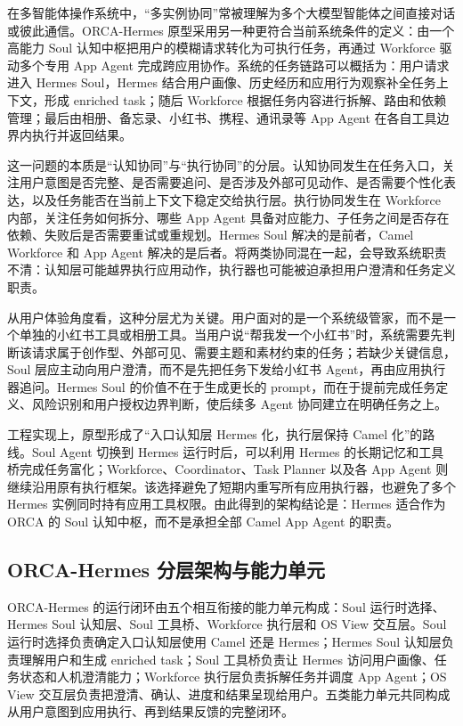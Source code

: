 在多智能体操作系统中，“多实例协同”常被理解为多个大模型智能体之间直接对话或彼此通信。ORCA-Hermes 原型采用另一种更符合当前系统条件的定义：由一个高能力 Soul 认知中枢把用户的模糊请求转化为可执行任务，再通过 Workforce 驱动多个专用 App Agent 完成跨应用协作。系统的任务链路可以概括为：用户请求进入 Hermes Soul，Hermes 结合用户画像、历史经历和应用行为观察补全任务上下文，形成 enriched task；随后 Workforce 根据任务内容进行拆解、路由和依赖管理；最后由相册、备忘录、小红书、携程、通讯录等 App Agent 在各自工具边界内执行并返回结果。

这一问题的本质是“认知协同”与“执行协同”的分层。认知协同发生在任务入口，关注用户意图是否完整、是否需要追问、是否涉及外部可见动作、是否需要个性化表达，以及任务能否在当前上下文下稳定交给执行层。执行协同发生在 Workforce 内部，关注任务如何拆分、哪些 App Agent 具备对应能力、子任务之间是否存在依赖、失败后是否需要重试或重规划。Hermes Soul 解决的是前者，Camel Workforce 和 App Agent 解决的是后者。将两类协同混在一起，会导致系统职责不清：认知层可能越界执行应用动作，执行器也可能被迫承担用户澄清和任务定义职责。

从用户体验角度看，这种分层尤为关键。用户面对的是一个系统级管家，而不是一个单独的小红书工具或相册工具。当用户说“帮我发一个小红书”时，系统需要先判断该请求属于创作型、外部可见、需要主题和素材约束的任务；若缺少关键信息，Soul 层应主动向用户澄清，而不是先把任务下发给小红书 Agent，再由应用执行器追问。Hermes Soul 的价值不在于生成更长的 prompt，而在于提前完成任务定义、风险识别和用户授权边界判断，使后续多 Agent 协同建立在明确任务之上。

工程实现上，原型形成了“入口认知层 Hermes 化，执行层保持 Camel 化”的路线。Soul Agent 切换到 Hermes 运行时后，可以利用 Hermes 的长期记忆和工具桥完成任务富化；Workforce、Coordinator、Task Planner 以及各 App Agent 则继续沿用原有执行框架。该选择避免了短期内重写所有应用执行器，也避免了多个 Hermes 实例同时持有应用工具权限。由此得到的架构结论是：Hermes 适合作为 ORCA 的 Soul 认知中枢，而不是承担全部 Camel App Agent 的职责。

\subsection{ORCA-Hermes 分层架构与能力单元}

ORCA-Hermes 的运行闭环由五个相互衔接的能力单元构成：Soul 运行时选择、Hermes Soul 认知层、Soul 工具桥、Workforce 执行层和 OS View 交互层。Soul 运行时选择负责确定入口认知层使用 Camel 还是 Hermes；Hermes Soul 认知层负责理解用户和生成 enriched task；Soul 工具桥负责让 Hermes 访问用户画像、任务状态和人机澄清能力；Workforce 执行层负责拆解任务并调度 App Agent；OS View 交互层负责把澄清、确认、进度和结果呈现给用户。五类能力单元共同构成从用户意图到应用执行、再到结果反馈的完整闭环。

